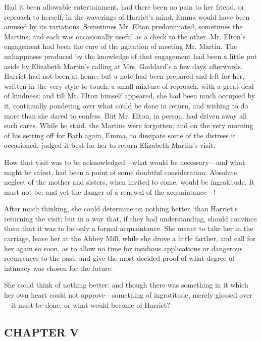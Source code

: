 Had it been allowable entertainment, had there been no pain to her friend, or reproach to herself, in the waverings of Harriet's mind, Emma would have been amused by its variations. Sometimes Mr. Elton predominated, sometimes the Martins; and each was occasionally useful as a check to the other. Mr. Elton's engagement had been the cure of the agitation of meeting Mr. Martin. The unhappiness produced by the knowledge of that engagement had been a little put aside by Elizabeth Martin's calling at Mrs. Goddard's a few days afterwards. Harriet had not been at home; but a note had been prepared and left for her, written in the very style to touch; a small mixture of reproach, with a great deal of kindness; and till Mr. Elton himself appeared, she had been much occupied by it, continually pondering over what could be done in return, and wishing to do more than she dared to confess. But Mr. Elton, in person, had driven away all such cares. While he staid, the Martins were forgotten; and on the very morning of his setting off for Bath again, Emma, to dissipate some of the distress it occasioned, judged it best for her to return Elizabeth Martin's visit.

How that visit was to be acknowledged---what would be necessary---and what might be safest, had been a point of some doubtful consideration. Absolute neglect of the mother and sisters, when invited to come, would be ingratitude. It must not be: and yet the danger of a renewal of the acquaintance---!

After much thinking, she could determine on nothing better, than Harriet's returning the visit; but in a way that, if they had understanding, should convince them that it was to be only a formal acquaintance. She meant to take her in the carriage, leave her at the Abbey Mill, while she drove a little farther, and call for her again so soon, as to allow no time for insidious applications or dangerous recurrences to the past, and give the most decided proof of what degree of intimacy was chosen for the future.

She could think of nothing better: and though there was something in it which her own heart could not approve---something of ingratitude, merely glossed over---it must be done, or what would become of Harriet?

\subsection[chapter-v-1]{\useURL[url24][][][]\from[url24]CHAPTER V}

